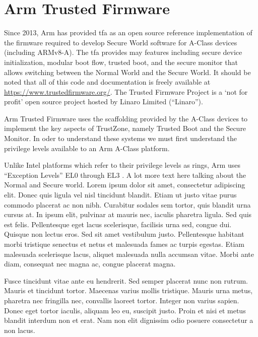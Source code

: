 \section{Arm Trusted Firmware}
Since 2013, Arm has provided \gls{tfa} as an open source reference implementation of the firmware required to develop Secure World software for A-Class devices (including ARMv8-A). The \gls{tfa} provides may features including secure device initialization, modular boot flow, trusted boot, and the secure monitor that allows switching between the Normal World and the Secure World. It should be noted that all of this code and documentation is freely available at \url{https://www.trustedfirmware.org/}. The Trusted Firmware Project is a `not for profit' open source project hosted by Linaro Limited (``Linaro'').

Arm Trusted Firmware uses the scaffolding provided by the A-Class devices to implement the key aspects of TrustZone, namely Trusted Boot and the Secure Monitor. In oder to understand these systems we must first understand the privilege levels available to an Arm A-Class platform.

\renewcommand{\arraystretch}{2.5}


Unlike Intel platforms which refer to their privilege levels as rings, Arm uses ``Exception Levels'' EL0 through EL3 \cite{ArmV8Fund}. A lot more text here talking about the Normal and Secure world. Lorem ipsum dolor sit amet, consectetur adipiscing elit. Donec quis ligula vel nisl tincidunt blandit. Etiam ut justo vitae purus commodo placerat ac non nibh. Curabitur sodales sem tortor, quis blandit urna cursus at. In ipsum elit, pulvinar at mauris nec, iaculis pharetra ligula. Sed quis est felis. Pellentesque eget lacus scelerisque, facilisis urna sed, congue dui. Quisque non lectus eros. Sed sit amet vestibulum justo. Pellentesque habitant morbi tristique senectus et netus et malesuada fames ac turpis egestas. Etiam malesuada scelerisque lacus, aliquet malesuada nulla accumsan vitae. Morbi ante diam, consequat nec magna ac, congue placerat magna.

Fusce tincidunt vitae ante eu hendrerit. Sed semper placerat nunc non rutrum. Mauris et tincidunt tortor. Maecenas varius mollis tristique. Mauris urna metus, pharetra nec fringilla nec, convallis laoreet tortor. Integer non varius sapien. Donec eget tortor iaculis, aliquam leo eu, suscipit justo. Proin et nisi et metus blandit interdum non et erat. Nam non elit dignissim odio posuere consectetur a non lacus.

